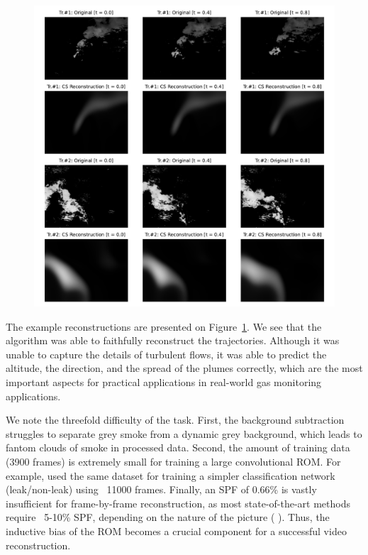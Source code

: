 \begin{figure}
	\centering
	\includegraphics[width=\textwidth]{figures/cs_gas_examples.pdf}
	\caption{\label{fig:cs_gas_examples}}
\end{figure}

The example reconstructions are presented on Figure~\ref{fig:cs_gas_examples}. We see that the algorithm was able to faithfully reconstruct the trajectories. Although it was unable to capture the details of turbulent flows, it was able to predict the altitude, the direction, and the spread of the plumes correctly, which are the most important aspects for practical applications in real-world gas monitoring applications. 

We note the threefold difficulty of the task. First, the background subtraction struggles to separate grey smoke from a dynamic grey background, which leads to fantom clouds of smoke in processed data. Second, the amount of training data (3900 frames) is extremely small for training a large convolutional ROM. For example, \cite{wang2020machine} used the same dataset for training a simpler classification network (leak/non-leak) using ~11000 frames. Finally, an SPF of 0.66\% is vastly insufficient for frame-by-frame reconstruction, as most state-of-the-art methods require ~5-10\% SPF, depending on the nature of the picture (	\cite{wang2022single}). Thus, the inductive bias of the ROM becomes a crucial component for a successful video reconstruction.


